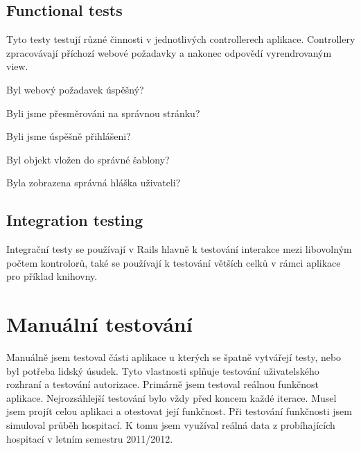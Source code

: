 \subsection{Functional tests}
Tyto testy testují různé činnosti v jednotlivých controllerech aplikace. Controllery zpracovávají příchozí webové požadavky a nakonec odpovědí vyrendrovaným view.

\begin{list}{•}{\textbf{Tento typ testů testuje:}}
\item Byl webový požadavek úspěšný?
\item Byli jsme přesměrováni na správnou stránku?
\item Byli jsme úspěšně přihlášeni?
\item Byl objekt vložen do správné šablony?
\item Byla zobrazena správná hláška uživateli?
\end{list} 

\subsection{Integration testing}
Integrační testy se používají v Rails hlavně k testování interakce mezi libovolným počtem kontrolorů, také se používají k testování větších celků v rámci aplikace pro příklad knihovny.

\section{Manuální testování}
Manuálně jsem testoval části aplikace u kterých se špatně vytvářejí  testy, nebo byl potřeba lidský úsudek. Tyto vlastnosti splňuje testování uživatelského rozhraní a testování autorizace. Primárně jsem testoval reálnou funkčnost aplikace. Nejrozsáhlejší testování bylo vždy před koncem každé iterace. Musel jsem projít celou aplikaci a otestovat její funkčnost. 
Při testování funkčnosti jsem simuloval průběh hospitací. K tomu jsem využíval reálná data z probíhajících hospitací v letním semestru 2011/2012.

